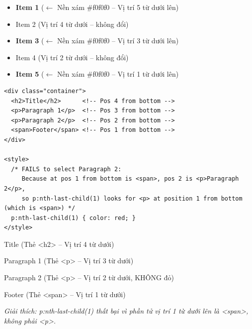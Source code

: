\documentclass[11pt,oneside]{book}
\begin{document}
\begin{browserWindow}
\sffamily\small
\begin{itemize}[leftmargin=1.5em, itemsep=3pt, parsep=0pt]
    \item \colorbox{gray!20}{\textbf{Item 1}} {\scriptsize\textcolor{gray!60}{($\leftarrow$ Nền xám \#f0f0f0 -- Vị trí 5 từ dưới lên)}}
    \item Item 2 {\scriptsize\textcolor{gray!60}{(Vị trí 4 từ dưới -- không đổi)}}
    \item \colorbox{gray!20}{\textbf{Item 3}} {\scriptsize\textcolor{gray!60}{($\leftarrow$ Nền xám \#f0f0f0 -- Vị trí 3 từ dưới lên)}}
    \item Item 4 {\scriptsize\textcolor{gray!60}{(Vị trí 2 từ dưới -- không đổi)}}
    \item \colorbox{gray!20}{\textbf{Item 5}} {\scriptsize\textcolor{gray!60}{($\leftarrow$ Nền xám \#f0f0f0 -- Vị trí 1 từ dưới lên)}}
\end{itemize}
\end{browserWindow}

\begin{codeWindow}
\begin{lstlisting}[language=HTML5]
<div class="container">
  <h2>Title</h2>      <!-- Pos 4 from bottom -->
  <p>Paragraph 1</p>  <!-- Pos 3 from bottom -->
  <p>Paragraph 2</p>  <!-- Pos 2 from bottom -->
  <span>Footer</span> <!-- Pos 1 from bottom -->
</div>

<style>
  /* FAILS to select Paragraph 2:
     Because at pos 1 from bottom is <span>, pos 2 is <p>Paragraph 2</p>,
     so p:nth-last-child(1) looks for <p> at position 1 from bottom (which is <span>) */
  p:nth-last-child(1) { color: red; }
</style>
\end{lstlisting}
\end{codeWindow}

\begin{browserWindow}
\sffamily\small
Title {\scriptsize\textcolor{gray!60}{(Thẻ <h2> -- Vị trí 4 từ dưới)}} \par\vspace{2pt}
Paragraph 1 {\scriptsize\textcolor{gray!60}{(Thẻ <p> -- Vị trí 3 từ dưới)}} \par\vspace{2pt}
Paragraph 2 {\scriptsize\textcolor{gray!60}{(Thẻ <p> -- Vị trí 2 từ dưới, KHÔNG đỏ)}} \par\vspace{2pt}
Footer {\scriptsize\textcolor{gray!60}{(Thẻ <span> -- Vị trí 1 từ dưới)}} \par\vspace{4pt}
{\scriptsize\textcolor{gray!60}{\textit{Giải thích: p:nth-last-child(1) thất bại vì phần tử vị trí 1 từ dưới lên là <span>, không phải <p>.}}}
\end{browserWindow}
\end{document}
